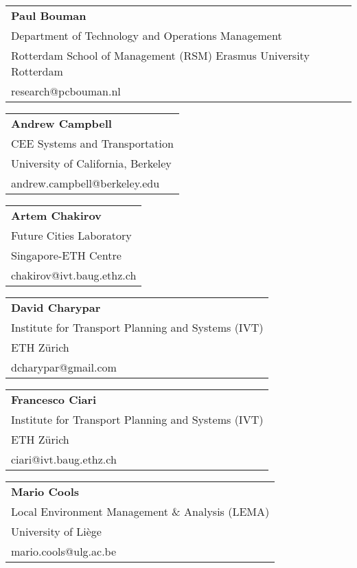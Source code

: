 \begin{tabular}[width=0.48\textwidth]{@{}l}
\textbf{Paul Bouman} \\
Department of Technology and Operations Management \\
Rotterdam School of Management (RSM) Erasmus University Rotterdam \\
research@pcbouman.nl \\
\end{tabular}

\begin{tabular}[width=0.48\textwidth]{@{}l}
\textbf{Andrew Campbell} \\
CEE Systems and Transportation \\
University of California, Berkeley \\
andrew.campbell@berkeley.edu \\
\end{tabular}

\begin{tabular}[width=0.48\textwidth]{@{}l}
\textbf{Artem Chakirov} \\
Future Cities Laboratory \\
Singapore-ETH Centre\\
chakirov@ivt.baug.ethz.ch \\
\end{tabular}

\begin{tabular}[width=0.48\textwidth]{@{}l}
\textbf{David Charypar} \\
Institute for Transport Planning and Systems (IVT) \\
ETH Zürich \\
dcharypar@gmail.com \\
\end{tabular}

\begin{tabular}[width=0.48\textwidth]{@{}l}
\textbf{Francesco Ciari} \\
Institute for Transport Planning and Systems (IVT) \\
ETH Zürich \\
ciari@ivt.baug.ethz.ch \\
\end{tabular}

\begin{tabular}[width=0.48\textwidth]{@{}l}
\textbf{Mario Cools} \\
Local Environment Management \& Analysis (LEMA) \\
University of Liège \\
mario.cools@ulg.ac.be \\
\end{tabular}

